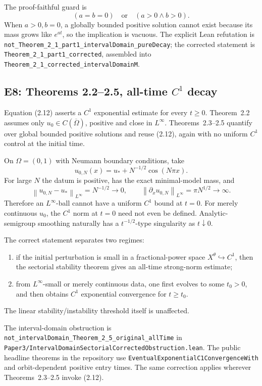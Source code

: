 \documentclass[11pt]{article}
\newcommand{\Om}{\Omega}
\newcommand{\norm}[1]{\left\lVert #1\right\rVert}
\newcommand{\code}[1]{\nolinkurl{#1}}
\begin{document}
The proof-faithful guard is
\[
  (a=b=0)\quad\text{or}\quad(a>0\land b>0).
\]
When \(a>0,b=0\), a globally bounded positive solution cannot exist because
its mass grows like \(e^{at}\), so the implication is vacuous.  The explicit
Lean refutation is
\code{not_Theorem_2_1_part1_intervalDomain_pureDecay}; the corrected statement
is \code{Theorem_2_1_part1_corrected}, assembled into
\code{Theorem_2_1_corrected_intervalDomainM}.

\subsection{E8: Theorems 2.2--2.5, all-time \(C^1\) decay}

Equation (2.12) asserts a \(C^1\) exponential estimate for every \(t\ge0\).
Theorem~2.2 assumes only \(u_0\in C(\overline\Om)\), positive and close in
\(L^\infty\).  Theorems~2.3--2.5 quantify over global bounded positive
solutions and reuse (2.12), again with no uniform \(C^1\) control at the
initial time.

On \(\Om=(0,1)\) with Neumann boundary conditions, take
\[
  u_{0,N}(x)=u_*+N^{-1/2}\cos(N\pi x).
\]
For large \(N\) the datum is positive, has the exact minimal-model mass, and
\[
 \norm{u_{0,N}-u_*}_{L^\infty}=N^{-1/2}\longrightarrow0,
 \qquad
 \norm{\partial_xu_{0,N}}_{L^\infty}=\pi N^{1/2}\longrightarrow\infty.
\]
Therefore an \(L^\infty\)-ball cannot have a uniform \(C^1\) bound at
\(t=0\).  For merely continuous \(u_0\), the \(C^1\) norm at \(t=0\) need not
even be defined.  Analytic-semigroup smoothing naturally has a
\(t^{-1/2}\)-type singularity as \(t\downarrow0\).

The correct statement separates two regimes:
\begin{enumerate}[leftmargin=2em]
\item if the initial perturbation is small in a fractional-power space
  \(X^\theta\hookrightarrow C^1\), then the sectorial stability theorem gives
  an all-time strong-norm estimate;
\item from \(L^\infty\)-small or merely continuous data, one first evolves to
  some \(t_0>0\), and then obtains \(C^1\) exponential convergence for
  \(t\ge t_0\).
\end{enumerate}
The linear stability/instability threshold itself is unaffected.

The interval-domain obstruction is
\code{not_intervalDomain_Theorem_2_5_original_allTime} in
\code{Paper3/IntervalDomainSectorialCorrectedObstruction.lean}.  The public
headline theorems in the repository use
\code{EventualExponentialC1ConvergenceWith} and orbit-dependent positive entry
times.  The same correction applies wherever Theorems~2.3--2.5 invoke
(2.12).
\end{document}
